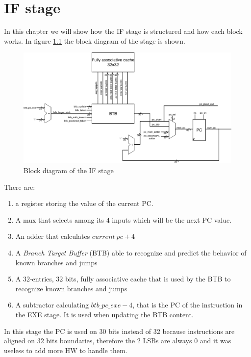 \chapter{IF stage}
\label{chap:if}

In this chapter we will show how the IF stage is structured and how each block works.
In figure \ref{fig:IF_stage} the block diagram of the stage is shown.

\begin{figure}[!ht]
	\centering
	\includegraphics[width=\linewidth]{./chapters/figures/IF_stage.pdf}
	\caption{Block diagram of the IF stage}
	\label{fig:IF_stage}
\end{figure}

There are:

\begin{enumerate}
    \item a register storing the value of the current PC.
    \item A mux that selects among its 4 inputs which will be the next PC value.
    \item An adder that calculates $current\ pc + 4$
    \item A {\it Branch Target Buffer} (BTB) able to recognize and predict the behavior of known branches and jumps
    \item A 32-entries, 32 bits, fully associative cache that is used by the BTB to recognize known branches and jumps
    \item A subtractor calculating $btb\_pc\_exe - 4$, that is the PC of the instruction in the EXE stage. It is used when updating the BTB content.
\end{enumerate}

In this stage the PC is used on 30 bits instead of 32 because instructions are aligned on 32 bits boundaries, therefore the 2 LSBs are always 0
and it was useless to add more HW to handle them.

